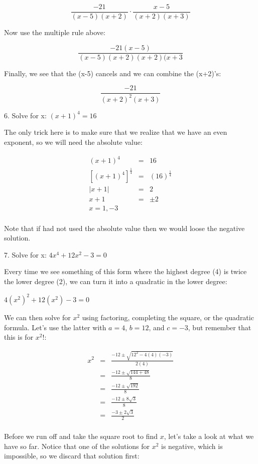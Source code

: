\documentclass[letterpaper, 12pt]{article}
\begin{document}
\[\frac{-21}{(x-5)(x+2)}\cdot\frac{x-5}{(x+2)(x+3)}\]

Now use the multiple rule above:

\[\frac{-21(x-5)}{(x-5)(x+2)(x+2)(x+3}\]

Finally, we see that the (x-5) cancels and we can combine the (x+2)'s:

\[\frac{-21}{(x+2)^2(x+3)}\]

\bigskip

6. Solve for x: $(x+1)^4=16$

\bigskip

The only trick here is to make sure that we realize that we have an even
exponent, so we will need the absolute value:

\begin{eqnarray*}
(x+1)^4 &=& 16 \\
\left[(x+1)^4\right]^{\frac{1}{4}} &=& (16)^{\frac{1}{4}} \\
|x+1| &=& 2 \\
x+1 &=& \pm2 \\
x=1, -3 \\
\end{eqnarray*}

Note that if had not used the absolute value then we would loose the negative
solution.

\bigskip

7. Solve for x: $4x^4+12x^2-3=0$

Every time we see something of this form where the highest degree (4) is twice
the lower degree (2), we can turn it into a quadratic in the lower degree:

$4(x^2)^2+12(x^2)-3=0$

We can then solve for $x^2$ using factoring, completing the square, or the
quadratic formula.  Let's use the latter with $a=4$, $b=12$, and $c=-3$, but
remember that this is for $x^2$!:

\begin{eqnarray*}
x^2 &=& \frac{-12\pm\sqrt{12^2-4(4)(-3)}}{2(4)} \\
    &=& \frac{-12\pm\sqrt{144+48}}{8} \\
    &=& \frac{-12\pm\sqrt{192}}{8} \\
    &=& \frac{-12\pm8\sqrt{3}}{8} \\
    &=& \frac{-3\pm2\sqrt{3}}{2} \\
\end{eqnarray*}

Before we run off and take the square root to find $x$, let's take a look at
what we have so far.  Notice that one of the solutions for $x^2$ is negative,
which is impossible, so we discard that solution first:
\end{document}

